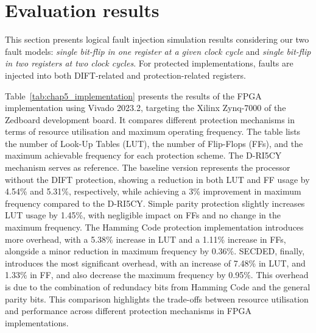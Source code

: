 \section{Evaluation results}

This section presents logical fault injection simulation results considering our two fault models: \textit{single bit-flip in one register at a given clock cycle} and \textit{single bit-flip in two registers at two clock cycles}. For protected implementations, faults are injected into both DIFT-related and protection-related registers.

Table~\ref{tab:chap5_implementation} presents the results of the FPGA implementation using Vivado 2023.2, targeting the Xilinx Zynq-7000 of the Zedboard development board. It compares different protection mechanisms in terms of resource utilisation and maximum operating frequency. The table lists the number of Look-Up Tables (LUT), the number of Flip-Flops (FFs), and the maximum achievable frequency for each protection scheme. The D-RI5CY mechanism serves as reference. The baseline version represents the processor without the DIFT protection, showing a reduction in both LUT and FF usage by 4.54\% and 5.31\%, respectively, while achieving a 3\% improvement in maximum frequency compared to the D-RI5CY.
Simple parity protection slightly increases LUT usage by 1.45\%, with negligible impact on FFs and no change in the maximum frequency. The Hamming Code protection implementation introduces more overhead, with a 5.38\% increase in LUT and a 1.11\% increase in FFs, alongside a minor reduction in maximum frequency by 0.36\%.
SECDED, finally, introduces the most significant overhead, with an increase of 7.48\% in LUT, and 1.33\% in FF, and also decrease the maximum frequency by 0.95\%. This overhead is due to the combination of redundacy bits from Hamming Code and the general parity bits.
This comparison highlights the trade-offs between resource utilisation and performance across different protection mechanisms in FPGA implementations.


